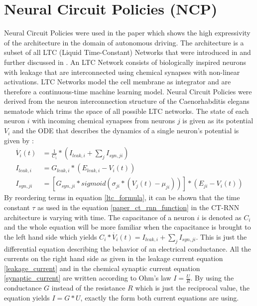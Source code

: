 \documentclass[draft,final]{vutinfth} %
\begin{document}
    \section{Neural Circuit Policies (NCP)} \label{ncp}
    Neural Circuit Policies were used in the paper \cite{NCP} which shows the high expressivity of the architecture in the domain of autonomous driving.
    The architecture is a subset of all LTC (Liquid Time-Constant) Networks that were introduced in \cite{LTCFormulas} and further discussed in \cite{LTCNetworks}.
    An LTC Network consists of biologically inspired neurons with leakage that are interconnected using chemical synapses with non-linear activations.
    LTC Networks model the cell membrane as integrator and are therefore a continuous-time machine learning model.
    Neural Circuit Policies were derived from the neuron interconnection structure of the Caenorhabditis elegans nematode \cite[p. 3]{NCP} which trims the space of all possible LTC networks.
    The state of each neuron $i$ with incoming chemical synapses from neurons $j$ is given as its potential $V_i$ and the ODE that describes the dynamics of a single neuron's potential is given by \cite[p. 1-2]{LTCFormulas}:
    \begin{align}
    \label{ltc_formula}
    \dot{V_i}(t) &= \frac{1}{C_i} * (I_{leak,i} + \sum_j{I_{syn,ji}}) \\
    \label{leakage_current}
    I_{leak,i} &= G_{leak,i} * (E_{leak,i} - V_i(t)) \\
    \label{synaptic_current}
    I_{syn,ji} &= [G_{syn,ji} * sigmoid(\sigma_{ji}*(V_j(t)-\mu_{ji}))] * (E_{ji} - V_i(t))
    \end{align}
    By reordering terms in equation \ref{ltc_formula}, it can be shown that the time constant $\tau$ as used in the equation \ref{paper_ct_rnn_function} in the CT-RNN architecture is varying with time.
    The capacitance of a neuron $i$ is denoted as $C_i$ and the whole equation will be more familiar when the capacitance is brought to the left hand side which yields $C_i * \dot{V_i}(t) = I_{leak,i} + \sum_j{I_{syn,ji}}$.
    This is just the differential equation describing the behavior of an electrical conductance.
    All the currents on the right hand side as given in the leakage current equation \ref{leakage_current} and in the chemical synaptic current equation \ref{synaptic_current} are written according to Ohm's law $I = \frac{U}{R}$.
    By using the conductance $G$ instead of the resistance $R$ which is just the reciprocal value, the equation yields $I = G * U$, exactly the form both current equations are using.
\end{document}
